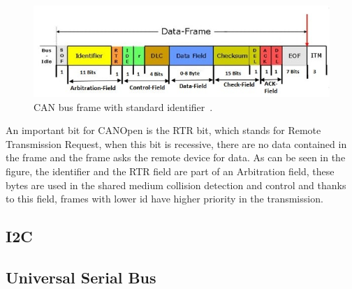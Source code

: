 \begin{figure}[H]
    \centering
    \includegraphics[width=\textwidth]{obrazky/can_frame}
    \caption{CAN bus frame with standard identifier~\cite{piembsystech}.}
    \label{fig:can_frame}
\end{figure}

An important bit for CANOpen is the RTR bit, which stands for Remote Transmission Request, when this bit is recessive, there are no data contained in the frame and the frame asks the remote device for data.
As can be seen in the figure, the identifier and the RTR field are part of an Arbitration field, these bytes are used in the shared medium collision detection and control and thanks to this field, frames with lower id have higher priority in the transmission.

\subsection{I2C}
\label{subsec:i2c}

\subsection{Universal Serial Bus}
\label{subsec:usb}
